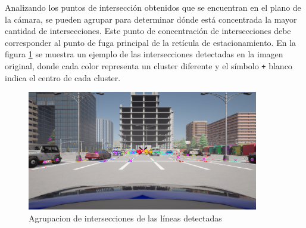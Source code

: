 Analizando los puntos de intersección obtenidos que se encuentran en el plano de la cámara, se pueden agrupar para determinar dónde está
concentrada la mayor cantidad de intersecciones.
Este punto de concentración de intersecciones debe corresponder al punto de fuga principal de la retícula de estacionamiento.
En la figura \ref{fig:intersections} se muestra un ejemplo de las intersecciones detectadas en la imagen original,
donde cada color representa un cluster diferente y el símbolo \texttt{+} blanco indica el centro de cada cluster.
\\

\begin{figure}[!ht]
    \centering
    \includegraphics[width=0.9\textwidth]{img/reticule/svd-km}
    \caption{Agrupacion de intersecciones de las líneas detectadas}
    \label{fig:intersections}
\end{figure}

